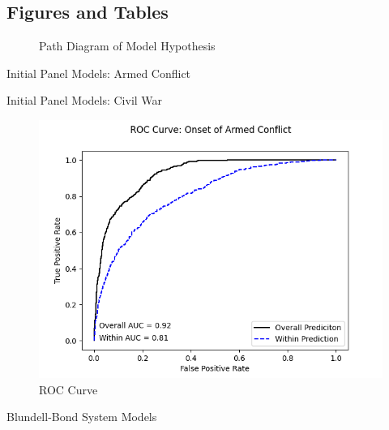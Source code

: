 \newpage

\begin{appendix}
    \section{Figures and Tables}
    

    \clearpage
    \newpage

    \begin{figure}[!h]
        \caption{Path Diagram of Model Hypothesis}
        \centering
        
        \label{path}
    \end{figure}

    \clearpage
    \newpage

    \begin{table}[!h]
        \caption{Initial Panel Models: Armed Conflict}
        \centering
        
        \label{tab::armed}
    \end{table}

    \begin{table}[!h]
        \caption{Initial Panel Models: Civil War}
        \centering
        
        \label{tab::civil}
    \end{table}

    \begin{figure}[!h]
        \centering
        \includegraphics{ROC_FE.png}
        \caption{ROC Curve}
        \label{rocfe}
    \end{figure}

    \begin{table}[!h]
        \caption{Blundell-Bond System Models}
        \begin{minipage}{.5\linewidth}
          
        \end{minipage}%
        \begin{minipage}{.5\linewidth}
            
        \end{minipage}
        \label{gmm_mods}
    \end{table}


\end{appendix}
